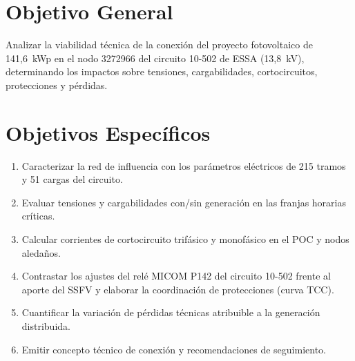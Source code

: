 \section{Objetivo General}

Analizar la viabilidad técnica de la conexión del proyecto fotovoltaico de 141,6~kWp en el nodo 3272966 del circuito 10-502 de ESSA (13,8~kV), determinando los impactos sobre tensiones, cargabilidades, cortocircuitos, protecciones y pérdidas.

\section{Objetivos Específicos}

\begin{enumerate}
    \item Caracterizar la red de influencia con los parámetros eléctricos de 215 tramos y 51 cargas del circuito.
    \item Evaluar tensiones y cargabilidades con/sin generación en las franjas horarias críticas.
    \item Calcular corrientes de cortocircuito trifásico y monofásico en el POC y nodos aledaños.
    \item Contrastar los ajustes del relé MICOM P142 del circuito 10-502 frente al aporte del SSFV y elaborar la coordinación de protecciones (curva TCC).
    \item Cuantificar la variación de pérdidas técnicas atribuible a la generación distribuida.
    \item Emitir concepto técnico de conexión y recomendaciones de seguimiento.
\end{enumerate}
